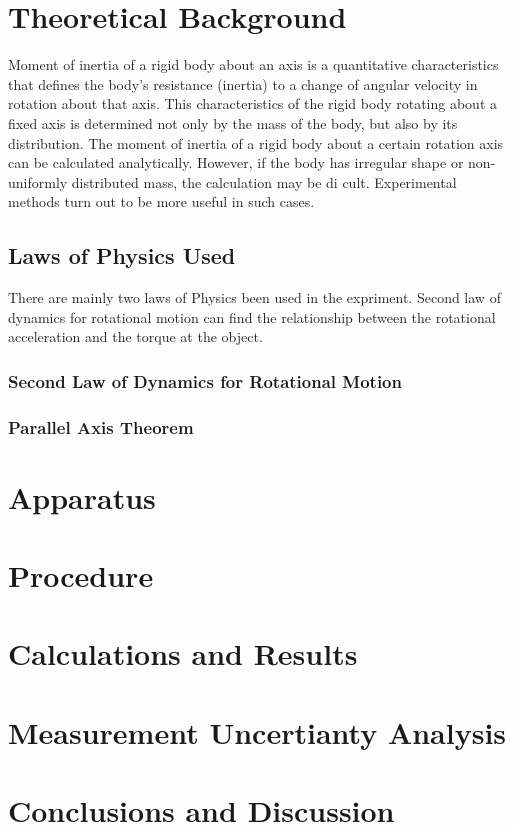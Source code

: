 \documentclass[12pt,a4paper]{article}
\begin{document}


\doublespacing 
\newpage

\section{Theoretical Background}

Moment of inertia of a rigid body about an axis is a quantitative
characteristics that defines the body’s resistance (inertia) to a change of
angular velocity in rotation about that axis. 
This characteristics of the rigid body rotating about a fixed axis is determined
not only by the mass of the body, but also by its distribution. 
The moment of inertia of a rigid body about a certain rotation axis can be
calculated analytically. 
However, if the body has irregular shape or non-uniformly distributed mass, the
calculation may be di cult.
Experimental methods turn out to be more useful in such cases.

\subsection{Laws of Physics Used}

There are mainly two laws of Physics been used in the expriment. Second law of
dynamics for rotational motion can find the relationship between the rotational
acceleration and the torque at the object.

\subsubsection{Second Law of Dynamics for Rotational Motion}

\subsubsection{Parallel Axis Theorem}


\section{Apparatus}

\section{Procedure}

\section{Calculations and Results}

\section{Measurement Uncertianty Analysis}

\section{Conclusions and Discussion}

\end{document}
